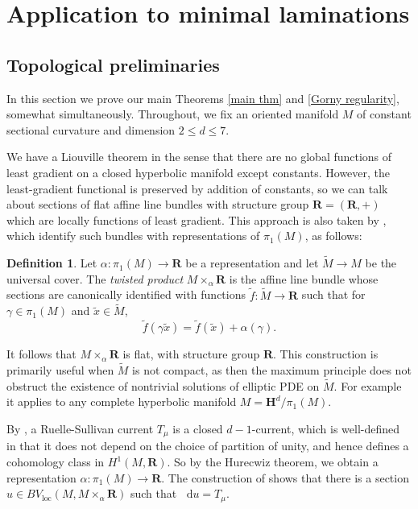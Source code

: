 \documentclass[reqno,11pt]{amsart}
\newcommand{\RR}{\mathbf{R}}
\newcommand{\Hyp}{\mathbf H}
\newcommand*\dif{\mathop{}\!\mathrm{d}}
\newcommand{\dfn}[1]{\emph{#1}\index{#1}}
\newcommand{\loc}{\mathrm{loc}}
\theoremstyle{definition}
\newtheorem{definition}[theorem]{Definition}
\numberwithin{equation}{section}
\begin{document}
\section{Application to minimal laminations}\label{GornySec}
\subsection{Topological preliminaries} \label{LamPrelim}
In this section we prove our main Theorems \ref{main thm} and \ref{Gorny regularity}, somewhat simultaneously.
Throughout, we fix an oriented manifold $M$ of constant sectional curvature and dimension $2 \leq d \leq 7$.

We have a Liouville theorem in the sense that there are no global functions of least gradient on a closed hyperbolic manifold except constants.
However, the least-gradient functional is preserved by addition of constants, so we can talk about sections of flat affine line bundles with structure group $\RR = (\RR, +)$ which are locally functions of least gradient.
This approach is also taken by \cite[\S2.1]{daskalopoulos2020transverse}, which identify such bundles with representations of $\pi_1(M)$, as follows:

\begin{definition}
Let $\alpha: \pi_1(M) \to \RR$ be a representation and let $\tilde M \to M$ be the universal cover.
The \dfn{twisted product} $M \times_\alpha \RR$ is the affine line bundle whose sections are canonically identified with functions $\tilde f: \tilde M \to \RR$ such that for $\gamma \in \pi_1(M)$ and $\tilde x \in \tilde M$,
$$\tilde f(\gamma \tilde x) = \tilde f(\tilde x) + \alpha(\gamma).$$
\end{definition}

It follows that $M \times_\alpha \RR$ is flat, with structure group $\RR$.
This construction is primarily useful when $\tilde M$ is not compact, as then the maximum principle does not obstruct the existence of nontrivial solutions of elliptic PDE on $\tilde M$.
For example it applies to any complete hyperbolic manifold $M = \Hyp^d/\pi_1(M)$.

By \cite{Ruelle75}, a Ruelle-Sullivan current $T_\mu$ is a closed $d-1$-current, which is well-defined in that it does not depend on the choice of partition of unity, and hence defines a cohomology class in $H^1(M, \RR)$. So by the Hurecwiz theorem, we obtain a representation $\alpha: \pi_1(M) \to \RR$.
The construction of \cite[Theorem 8.3]{daskalopoulos2020transverse} shows that there is a section $u \in BV_\loc(M, M \times_\alpha \RR)$ such that $\dif u = T_\mu$.
\end{document}
